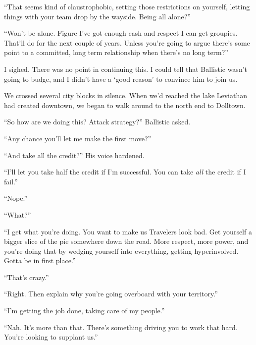 ``That seems kind of claustrophobic, setting those restrictions on yourself, letting things with your team drop by the wayside.  Being all alone?''



``Won't be alone.  Figure I've got enough cash and respect I can get groupies.  That'll do for the next couple of years.  Unless you're going to argue there's some point to a committed, long term relationship when there's no long term?''



I sighed.  There was no point in continuing this.  I could tell that Ballistic wasn't going to budge, and I didn't have a `good reason' to convince him to join us.



We crossed several city blocks in silence.  When we'd reached the lake Leviathan had created downtown, we began to walk around to the north end to Dolltown.



``So how are we doing this?  Attack strategy?''  Ballistic asked.



``Any chance you'll let me make the first move?''



``And take all the credit?''  His voice hardened.



``I'll let you take half the credit if I'm successful.  You can take \emph{all} the credit if I fail.''



``Nope.''



``What?''



``I get what you're doing.  You want to make us Travelers look bad.  Get yourself a bigger slice of the pie somewhere down the road.  More respect, more power, and you're doing that by wedging yourself into everything, getting hyperinvolved.  Gotta be in first place.''



``That's crazy.''



``Right.  Then explain why you're going overboard with your territory.''



``I'm getting the job done, taking care of my people.''



``Nah.  It's more than that.  There's something driving you to work that hard.  You're looking to supplant us.''



